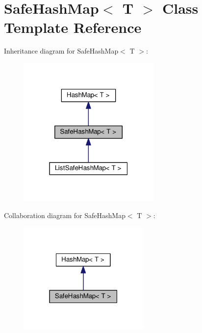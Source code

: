 \hypertarget{classSafeHashMap}{}\section{Safe\+Hash\+Map$<$ T $>$ Class Template Reference}
\label{classSafeHashMap}


Inheritance diagram for Safe\+Hash\+Map$<$ T $>$\+:
\nopagebreak
\begin{figure}[H]
\begin{center}
\leavevmode
\includegraphics[width=199pt]{classSafeHashMap__inherit__graph}
\end{center}
\end{figure}


Collaboration diagram for Safe\+Hash\+Map$<$ T $>$\+:
\nopagebreak
\begin{figure}[H]
\begin{center}
\leavevmode
\includegraphics[width=183pt]{classSafeHashMap__coll__graph}
\end{center}
\end{figure}
